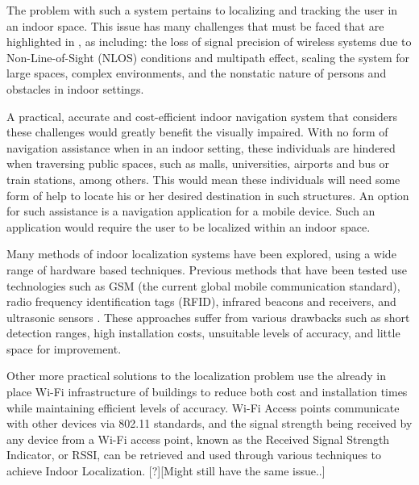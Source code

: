 \documentclass[conference]{IEEEtran}
\begin{document}
The problem with such a system pertains to localizing and tracking the user in an indoor space. This issue has many challenges that must be faced that are highlighted in \cite{mainetti2014survey}, as including: the loss of signal precision of wireless systems due to Non-Line-of-Sight (NLOS) conditions and multipath effect, scaling the system for large spaces, complex environments, and the nonstatic nature of persons and obstacles in indoor settings.

A practical, accurate and cost-efficient indoor navigation system that considers these challenges would greatly benefit the visually impaired. With no form of navigation assistance when in an indoor setting, these individuals are hindered when traversing public spaces, such as malls, universities, airports and bus or train stations, among others. This would mean these individuals will need some form of help to locate his or her desired destination in such structures. An option for such assistance is a navigation application for a mobile device. Such an application would require the user to be localized within an indoor space.

Many methods of indoor localization systems have been explored, using a wide range of hardware based techniques. Previous methods that have been tested use technologies such as GSM (the current global mobile communication standard), radio frequency identification tags (RFID), infrared beacons and receivers, and ultrasonic sensors \cite{otsason2005accurate,li2011performance,liu2014survey,ward1997new,medina2013ultrasound}. These approaches suffer from various drawbacks such as short detection ranges, high installation costs, unsuitable levels of accuracy, and little space for improvement.

Other more practical solutions to the localization problem use the already in place Wi-Fi infrastructure of buildings to reduce both cost and installation times while maintaining efficient levels of accuracy. Wi-Fi Access points communicate with other devices via 802.11 standards, and the signal strength being received by any device from a Wi-Fi access point, known as the Received Signal Strength Indicator, or RSSI, can be retrieved and used through various techniques to achieve Indoor Localization. [?][Might still have the same issue..]
\end{document}
